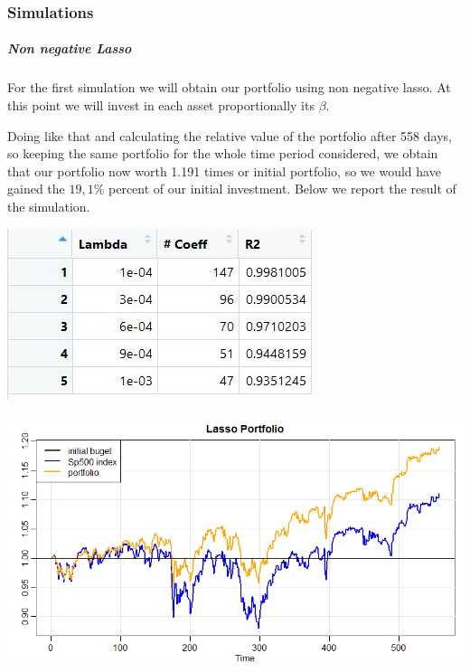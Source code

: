 \documentclass{article}%
\begin{document}
\subsubsection{Simulations}

\subparagraph{Non negative Lasso}
For the first simulation we will obtain our portfolio using non negative lasso. At this point we will invest in each asset proportionally its $\beta$. 

Doing like that and calculating the relative value of the portfolio after 558 days, so keeping the same portfolio for the whole time period considered, we obtain that our portfolio now worth  1.191 times or initial portfolio, so we would have gained the $19,1\%$ percent of our initial investment. Below we report the result of the simulation.
\\
\begin{center}
\includegraphics[scale=0.75]{tablasso}
\\

\end{center}


\includegraphics[scale=0.60]{lassoportfolio}
\\


  
\end{document}
